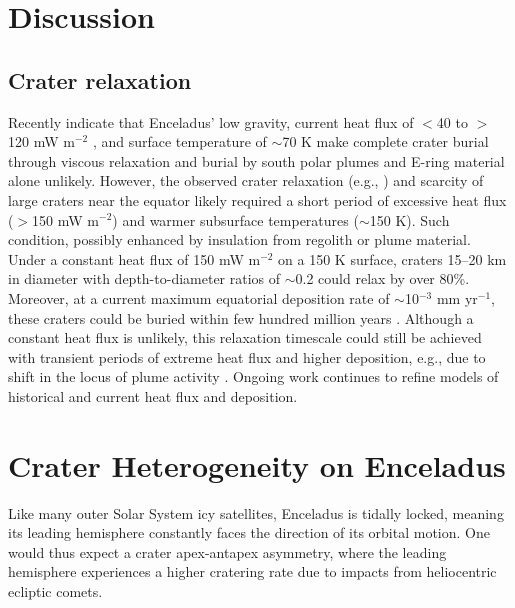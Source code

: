 \documentclass[preprint,12pt,3p,times,authoryear]{elsarticle}
\begin{document}

\section{Discussion}




\subsection{Crater relaxation}
\label{subsec:relax}
Recently \citet{Bland2012,Martin2023} indicate that Enceladus’ low gravity, current heat flux of $<$40 to $>$120 mW m$^{-2}$ \citep{Cadek2019,Kinczyk2024}, and surface temperature of $\sim$70 K make complete crater burial through viscous relaxation and burial by south polar plumes and E-ring material alone unlikely. However, the observed crater relaxation (e.g., \citealt{Bland2012}) and scarcity of large craters near the equator likely required a short period of excessive heat flux ($>$150 mW m$^{-2}$) and warmer subsurface temperatures ($\sim$150 K). Such condition, possibly enhanced by insulation from regolith or plume material. Under a constant heat flux of 150 mW m$^{-2}$ on a 150 K surface, craters 15–20 km in diameter with depth-to-diameter ratios of $\sim$0.2 could relax by over 80\%. Moreover, at a current maximum equatorial deposition rate of $\sim$10$^{-3}$ mm yr$^{-1}$, these craters could be buried within few hundred million years \citep{Bland2012}. Although a constant heat flux is unlikely, this relaxation timescale could still be achieved with transient periods of extreme heat flux and higher deposition, e.g., due to shift in the locus of plume activity \citep{Bland2012}. Ongoing work continues to refine models of historical and current heat flux and deposition.


\section{Crater Heterogeneity on Enceladus}
\label{app:hetero}
Like many outer Solar System icy satellites, Enceladus is tidally locked, meaning its leading hemisphere constantly faces the direction of its orbital motion. One would thus expect a crater apex-antapex asymmetry, where the leading hemisphere experiences a higher cratering rate due to impacts from heliocentric ecliptic comets.\\
\end{document}
